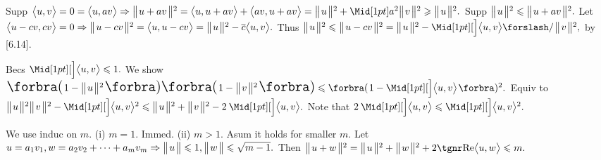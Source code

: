 

\vspace{4pt}

\SepLine

Supp $\Ang{u,v}=0=\Ang{u,av}\Rightarrow\Dvert{u+av}{^2}=\Ang{u,u+av}+\Ang{av,u+av}=\Dvert{u}{^2}+\aMid{a}{^2}\Dvert{v}{^2}\geqslant\Dvert{u}{^2}.$\vspace{2pt}\parSol{}
Supp $\big\Vert\hspace{1pt}{u}\hspace{1pt}\big\Vert{^2}\leqslant\big\Vert\hspace{1pt}{u+av}\hspace{1pt}\big\Vert{^2}.$ Let $\big\langle{u-cv,cv}\big\rangle=0\Rightarrow\big\Vert\hspace{1pt}{u-cv}\hspace{1pt}\big\Vert{^2}=\big\langle{u,u-cv}\big\rangle=\big\Vert\hspace{1pt}{u}\hspace{1pt}\big\Vert{^2}-\overline{c}\big\langle{u,v}\big\rangle.$\parSol{}
Thus $\Dvert{u}{^2}\leqslant\Dvert{u-cv}{^2}=\Dvert{u}{^2}-\aXMid{\Ang{u,v}}{\;\!\XSlash\;\!}\Dvert{v}{^2},$ by [6.14].\PfEnd
\SepLine

Becs $\aXMid{\Ang{u,v}}\leqslant 1.$ We show $\BigPar{1-\Dvert{u}{^2}}\BigPar{1-\Dvert{v}{^2}}\leqslant\BigBigPar{1-\aXMid{\Ang{u,v}}}{^2}.$\parSol{}
Equiv to $\Dvert{u}{^2}\Dvert{v}{^2}-\aXMid{\Ang{u,v}}{^2}\leqslant\Dvert{u}{^2}+\Dvert{v}{^2}-2\:\aXMid{\Ang{u,v}}.$ Note that $2\:\aXMid{\Ang{u,v}}\leqslant\aXMid{\Ang{u,v}}{^2}.$\parSol{}

\SepLine


\SepLine

We use induc on $m.$ (i) $m=1.$ Immed. (ii) $m>1.$ Asum it holds for smaller $m.$\parSol{}
Let $u=a_1v_1,w=a_2v_2+\dots+a_mv_m\Rightarrow\big\Vert\hspace{1pt}{u}\hspace{1pt}\big\Vert\leqslant1,\big\Vert\hspace{1pt}{w}\hspace{1pt}\big\Vert\leqslant\sqrt{m-1}.$\parSol{}
Then $\Dvert{u+w}{^2}=\Dvert{u}{^2}+\Dvert{w}{^2}+2\REAL\Ang{u,w}\leqslant m.$
\SepLine


\ChEnd\pagebreak


\ChEnd\pagebreak


\ChEnd\pagebreak


\ChEnd\pagebreak


\ChEnd